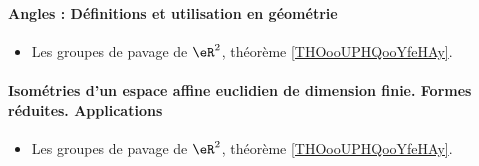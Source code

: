 \paragraph{Angles : Définitions et utilisation en géométrie}
\begin{itemize}
    \item Les groupes de pavage de \( \eR^2\), théorème \ref{THOooUPHQooYfeHAy}.
\end{itemize}
\paragraph{Isométries d'un espace affine euclidien de dimension finie. Formes réduites. Applications}
\begin{itemize}
    \item Les groupes de pavage de \( \eR^2\), théorème \ref{THOooUPHQooYfeHAy}.
\end{itemize}
